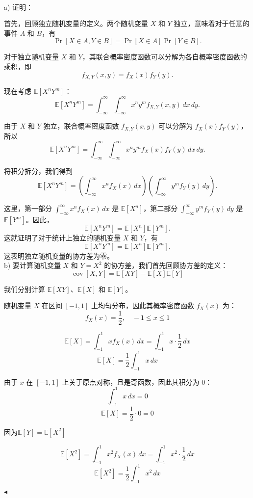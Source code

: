 \documentclass[11pt]{article}
\newenvironment{question}[2][Question]{\begin{trivlist}
\item[\hskip \labelsep {\bfseries #1}\hskip \labelsep {\bfseries #2.}]}{\hfill$\blacktriangleleft$\end{trivlist}}
\newcommand\E{\mathbb{E}}
\newcommand{\cov}{\operatorname{cov}}
\begin{document}
    \begin{question}{2 (30') (独立性)}~\\

    a) 证明：

    首先，回顾独立随机变量的定义。两个随机变量 \(X\) 和 \(Y\) 独立，意味着对于任意的事件 \(A\) 和 \(B\)，有
    \[ \Pr[X \in A, Y \in B] = \Pr[X \in A] \Pr[Y \in B]. \]
    
    对于独立随机变量 \(X\) 和 \(Y\)，其联合概率密度函数可以分解为各自概率密度函数的乘积，即
    \[ f_{X,Y}(x,y) = f_X(x) f_Y(y). \]
    
    现在考虑 \(\E[X^n Y^m]\)：
    \[ \E[X^n Y^m] = \int_{-\infty}^{\infty} \int_{-\infty}^{\infty} x^n y^m f_{X,Y}(x,y) \, dx \, dy. \]
    
    由于 \(X\) 和 \(Y\) 独立，联合概率密度函数 \(f_{X,Y}(x,y)\) 可以分解为 \(f_X(x) f_Y(y)\)，所以
    \[ \E[X^n Y^m] = \int_{-\infty}^{\infty} \int_{-\infty}^{\infty} x^n y^m f_X(x) f_Y(y) \, dx \, dy. \]
    
    将积分拆分，我们得到
    \[ \E[X^n Y^m] = \left( \int_{-\infty}^{\infty} x^n f_X(x) \, dx \right) \left( \int_{-\infty}^{\infty} y^m f_Y(y) \, dy \right). \]
    
    这里，第一部分 \(\int_{-\infty}^{\infty} x^n f_X(x) \, dx\) 是 \(\E[X^n]\)，第二部分 \(\int_{-\infty}^{\infty} y^m f_Y(y) \, dy\) 是 \(\E[Y^m]\)。因此，
    \[ \E[X^n Y^m] = \E[X^n] \E[Y^m]. \]
    这就证明了对于统计上独立的随机变量 \(X\) 和 \(Y\)，有
    \[ \E[X^n Y^m] = \E[X^n] \E[Y^m]. \]
    这表明独立随机变量的协方差为零。\\

    b) 要计算随机变量 \( X \) 和 \( Y = X^2 \) 的协方差，我们首先回顾协方差的定义：
\[
\cov[X, Y] = \E[XY] - \E[X]\E[Y]
\]

我们分别计算 \(\E[XY]\)、\(\E[X]\) 和 \(\E[Y]\)。

随机变量 \( X \) 在区间 \([-1, 1]\) 上均匀分布，因此其概率密度函数 \( f_X(x) \) 为：
\[
f_X(x) = \frac{1}{2}, \quad -1 \leq x \leq 1
\]

\[
\E[X] = \int_{-1}^{1} x f_X(x) \, dx = \int_{-1}^{1} x \cdot \frac{1}{2} \, dx
\]
\[
\E[X] = \frac{1}{2} \int_{-1}^{1} x \, dx
\]

由于 \( x \) 在 \([-1, 1]\) 上关于原点对称，且是奇函数，因此其积分为 0：
\[
\int_{-1}^{1} x \, dx = 0
\]
\[
\E[X] = \frac{1}{2} \cdot 0 = 0
\]

因为\(\E[Y] = \E[X^2]\)

\[
\E[X^2] = \int_{-1}^{1} x^2 f_X(x) \, dx = \int_{-1}^{1} x^2 \cdot \frac{1}{2} \, dx
\]
\[
\E[X^2] = \frac{1}{2} \int_{-1}^{1} x^2 \, dx
\]


\end{question}
\end{document}
